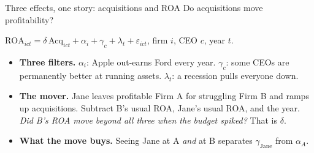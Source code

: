\documentclass[
  11pt,
  ignorenonframetext,
  aspectratio=169,
]{beamer}
\providecommand{\tightlist}{%
  \setlength{\itemsep}{0pt}\setlength{\parskip}{0pt}}
\begin{document}
\begin{frame}{Three effects, one story: acquisitions and ROA}
\protect{}\label{three-effects-one-story-acquisitions-and-roa}
Do acquisitions move profitability?

\begin{center}
$\text{ROA}_{ict} = \delta\,\text{Acq}_{ict} + \alpha_i + \gamma_c + \lambda_t + \varepsilon_{ict}$, firm $i$, CEO $c$, year $t$. 
\end{center}

\begin{itemize}
\tightlist
\item
  \textbf{Three filters.} \(\alpha_i\): Apple out-earns Ford every year.
  \(\gamma_c\): some CEOs are permanently better at running assets.
  \(\lambda_t\): a recession pulls everyone down.
\item
  \textbf{The mover.} Jane leaves profitable Firm A for struggling Firm
  B and ramps up acquisitions. Subtract B's usual ROA, Jane's usual ROA,
  and the year. \emph{Did B's ROA move beyond all three when the budget
  spiked?} That is \(\delta\).
\item
  \textbf{What the move buys.} Seeing Jane at A \emph{and} at B
  separates \(\gamma_{\text{Jane}}\) from \(\alpha_A\).
\end{itemize}
\end{frame}
\end{document}
